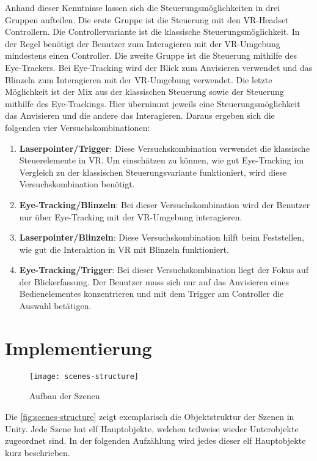 Anhand dieser Kenntnisse lassen sich die Steuerungsmöglichkeiten in drei Gruppen aufteilen. Die erste Gruppe ist die Steuerung mit den \ac{VR}-Headset Controllern. Die Controllervariante ist die klassische Steuerungsmöglichkeit. In der Regel benötigt der Benutzer zum Interagieren mit der \ac{VR}-Umgebung mindestens einen Controller. Die zweite Gruppe ist die Steuerung mithilfe des Eye-Trackers. Bei Eye-Tracking wird der Blick zum Anvisieren verwendet und das Blinzeln zum Interagieren mit der \ac{VR}-Umgebung verwendet. Die letzte Möglichkeit ist der Mix aus der klassischen Steuerung sowie der Steuerung mithilfe des Eye-Trackings. Hier übernimmt jeweils eine Steuerungsmöglichkeit das Anvisieren und die andere das Interagieren. Daraus ergeben sich die folgenden vier Versuchskombinationen:

\begin{enumerate}
	\item \textbf{Laserpointer/Trigger}: Diese Versuchskombination verwendet die klassische Steuerelemente in \ac{VR}. Um einschätzen zu können, wie gut Eye-Tracking im Vergleich zu der klassischen Steuerungsvariante funktioniert, wird diese Versuchskombination benötigt. 
	\item \textbf{Eye-Tracking/Blinzeln}: Bei dieser Versuchskombination wird der Benutzer nur über Eye-Tracking mit der \ac{VR}-Umgebung interagieren. 
	\item \textbf{Laserpointer/Blinzeln}: Diese Versuchskombination hilft beim Feststellen, wie gut die Interaktion in \ac{VR} mit Blinzeln funktioniert. 
	\item \textbf{Eye-Tracking/Trigger}: Bei dieser Versuchskombination liegt der Fokus auf der Blickerfassung. Der Benutzer muss sich nur auf das Anvisieren eines Bedienelementes konzentrieren und mit dem Trigger am Controller die Auswahl betätigen.
\end{enumerate}

\section{Implementierung}
\begin{figure}[!htbp]
	\centering
	\texttt{[image: scenes-structure]}
	\caption[Aufbau der Szenen]{Aufbau der Szenen}
	\label{fig:scenes-structure}
\end{figure}

Die \autoref{fig:scenes-structure} zeigt exemplarisch die Objektstruktur der Szenen in Unity. Jede Szene hat elf Hauptobjekte, welchen teilweise wieder Unterobjekte zugeordnet sind. In der folgenden Aufzählung wird jedes dieser elf Hauptobjekte kurz beschrieben.

